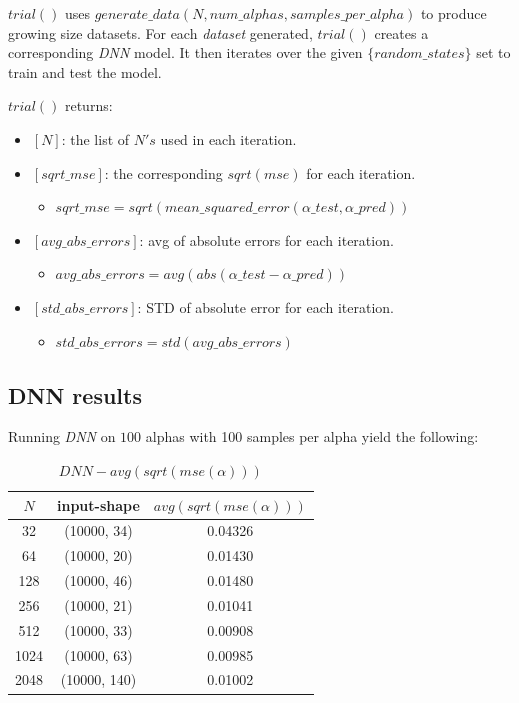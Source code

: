 \documentclass[a4paper, 12pt]{report}
\begin{document}
$trial()$ uses $generate\_data(N, num\_alphas, samples\_per\_alpha)$ to produce growing size datasets. For each \textit{dataset} generated, $trial()$ creates a corresponding \textit{DNN} model. It then iterates over the given $\{random\_states\}$ set to train and test the model.

\par $trial()$ returns:
\begin{itemize}
  \item $[N]$: the list of $N's$ used in each iteration.
  \item $[sqrt\_mse]$: the corresponding $sqrt(mse)$ for each iteration.
  \begin{itemize}
    \item $sqrt\_mse = sqrt(mean\_squared\_error(\alpha\_test, \alpha\_pred))$
  \end{itemize}
  \item $[avg\_abs\_errors]$: avg of absolute errors for each iteration.
  \begin{itemize}
    \item $avg\_abs\_errors = avg(abs(\alpha\_test - \alpha\_pred))$
  \end{itemize}
  \item $[std\_abs\_errors]$: STD of absolute error for each iteration.
  \begin{itemize}
    \item $std\_abs\_errors = std(avg\_abs\_errors)$
  \end{itemize}
\end{itemize}

\pagebreak
\subsection{DNN results}
\par Running \textit{DNN} on $100$ alphas with 100 samples per alpha yield the following:

\begin{table}[h!]
    \centering
    \begin{tabular}{||c c c||} 
        \hline
        $N$ & input-shape & $avg(sqrt(mse(\alpha)))$ \\ [0.5ex] 
        \hline\hline
        32 & (10000, 34) & 0.04326 \\ 
        \hline
        64 & (10000, 20) & 0.01430 \\
        \hline
        128 & (10000, 46) & 0.01480 \\
        \hline
        256 & (10000, 21) & 0.01041 \\
        \hline
        512 & (10000, 33) & 0.00908 \\ 
        \hline
        1024 & (10000, 63) & 0.00985 \\ 
        \hline
        2048 & (10000, 140) & 0.01002 \\ 
        \hline
    \end{tabular}
    \caption[$mse(\alpha)$ for $DNN$]{$DNN - avg(sqrt(mse(\alpha)))$}
    \label{table:1}
\end{table}
\end{document}
